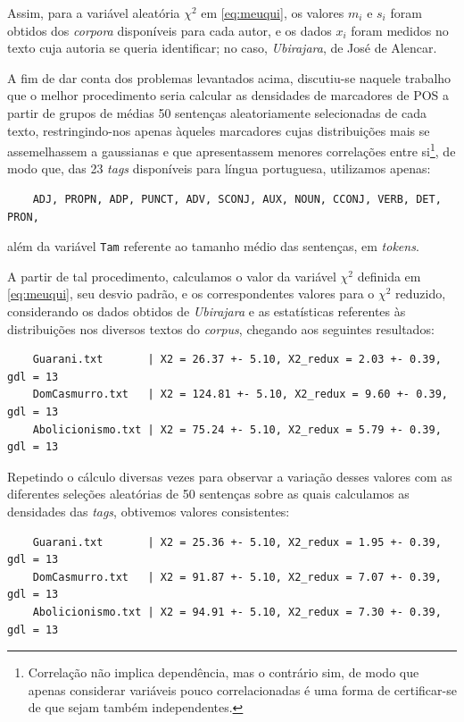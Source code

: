 \documentclass[10pt,a4paper,onecolumn]{article}
\theoremstyle{definition}
\theoremstyle{remark}
\begin{document}
Assim, para a variável aleatória $\chi^2$ em \eqref{eq:meuqui}, os valores $m_i$ e $s_i$ foram obtidos dos \emph{corpora} disponíveis para cada autor, e os dados $x_i$ foram medidos no texto cuja autoria se queria identificar; no caso, \emph{Ubirajara}, de José de Alencar.   

A fim de dar conta dos problemas levantados acima, discutiu-se naquele trabalho que o melhor procedimento seria calcular as densidades de marcadores de POS a partir de grupos de médias 50 sentenças aleatoriamente selecionadas de cada texto, restringindo-nos apenas àqueles marcadores cujas distribuições mais se assemelhassem a gaussianas e que apresentassem menores correlações entre si\footnote{Correlação não implica dependência, mas o contrário sim, de modo que apenas considerar variáveis pouco correlacionadas é uma forma de certificar-se de que sejam também independentes.}, de modo que, das 23 \emph{tags} disponíveis para língua portuguesa, utilizamos apenas:  
\begin{verbatim}
	ADJ, PROPN, ADP, PUNCT, ADV, SCONJ, AUX, NOUN, CCONJ, VERB, DET, PRON,
\end{verbatim} 
além da variável \texttt{Tam} referente ao tamanho médio das sentenças, em \emph{tokens}.

A partir de tal procedimento, calculamos o valor da variável $\chi^2$ definida em \eqref{eq:meuqui}, seu desvio padrão, e os correspondentes valores para o $\chi^2$ reduzido, considerando os dados obtidos de \emph{Ubirajara} e as estatísticas referentes às distribuições nos diversos textos do \emph{corpus}, chegando aos seguintes resultados:

\begin{verbatim}
	Guarani.txt       | X2 = 26.37 +- 5.10, X2_redux = 2.03 +- 0.39, gdl = 13
	DomCasmurro.txt   | X2 = 124.81 +- 5.10, X2_redux = 9.60 +- 0.39, gdl = 13
	Abolicionismo.txt | X2 = 75.24 +- 5.10, X2_redux = 5.79 +- 0.39, gdl = 13
\end{verbatim}
Repetindo o cálculo diversas vezes para observar a variação desses valores com as diferentes seleções aleatórias de 50 sentenças sobre as quais calculamos as densidades das \emph{tags}, obtivemos valores consistentes:

\begin{verbatim}
	Guarani.txt       | X2 = 25.36 +- 5.10, X2_redux = 1.95 +- 0.39, gdl = 13
	DomCasmurro.txt   | X2 = 91.87 +- 5.10, X2_redux = 7.07 +- 0.39, gdl = 13
	Abolicionismo.txt | X2 = 94.91 +- 5.10, X2_redux = 7.30 +- 0.39, gdl = 13
\end{verbatim}
\end{document}
